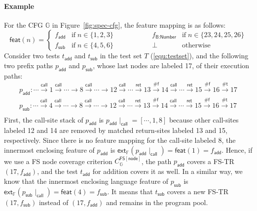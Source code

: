 \documentclass[acmsmall,review,screen]{acmart}
\newcommand{\tif}{\text{if} \; }
\newcommand{\telse}{\text{otherwise}}
\newcommand{\name}[1]{\textsf{#1}}
\newcommand{\graph}{\mathbb{G}}
\newcommand{\node}{n}
\newcommand{\edge}[1]{\xrightarrow{#1}}
\newcommand{\call}{\edge{\name{call}}}
\newcommand{\ret}{\edge{\name{ret}}}
\newcommand{\tedge}{\edge{\name{\#t}}}
\newcommand{\fedge}{\edge{\name{\#f}}}
\newcommand{\pat}{p}
\newcommand{\addpat}{\pat_\name{add}}
\newcommand{\subpat}{\pat_\name{sub}}
\newcommand{\test}{t}
\newcommand{\addtest}{\test_\name{add}}
\newcommand{\subtest}{\test_\name{sub}}
\newcommand{\cov}[1]{C_{#1}}
\newcommand{\featset}{\mathbb{F}}
\newcommand{\feat}{f}
\newcommand{\addfeat}{\feat_{\name{add}}}
\newcommand{\subfeat}{\feat_{\name{sub}}}
\newcommand{\numfeat}{\feat_{\name{B:Number}}}
\newcommand{\featmap}{\name{feat}}
\newcommand{\extfeat}{\name{ext}_\featset}
\newcommand{\css}[1]{{#1}\!\mid_{\name{call}}}
\newcommand{\fnodecov}[1]{\cov{#1}^{\name{FS}[\name{node}]}}
\providecommand{\DIFaddtex}[1]{{\protect\color{blue}\uwave{#1}}} %
\providecommand{\DIFaddbegin}{} %
\providecommand{\DIFaddend}{} %
\providecommand{\DIFadd}[1]{\texorpdfstring{\DIFaddtex{#1}}{#1}} %
\newcommand{\DIFaddincludegraphics}[2][]{{\color{blue}\fbox{\DIFOincludegraphics[#1]{#2}}}} %
\DeclareRobustCommand{\DIFaddbegin}{\DIFOaddbegin \let\includegraphics\DIFaddincludegraphics} %
\DeclareRobustCommand{\DIFaddend}{\DIFOaddend \let\includegraphics\DIFOincludegraphics} %
\begin{document}
\paragraph{\textbf{Example}}
%
For the CFG $\graph$ in Figure~\ref{fig:spec-cfg}, \DIFaddbegin \DIFadd{assume that }\DIFaddend the feature
mapping is as follows:
\begin{equation}\label{equ:featmap}
  \featmap(\node) = \left\{
    \begin{array}{lllll}
      \addfeat & \tif \node \in \{ 1, 2, 3\} &\qquad\qquad&
      \numfeat & \tif \node \in \{ 23, 24, 25, 26 \} \\

      \subfeat & \tif \node \in \{ 4, 5, 6\} &&
      \bot & \telse
    \end{array}
  \right.
\end{equation}
%
Consider two tests $\addtest$ and $\subtest$ in the test set $T$
(\ref{equ:testset}), and the following two prefix paths $\addpat$ and $\subpat$,
whose last nodes are labeled 17, of their execution paths:
%
\[
  \begin{array}{l}
    \addpat: \cdots \call 1 \call \cdots \edge{} 8 \call \cdots \edge{} 12 \call
    \cdots \ret 13 \fedge 14 \call \cdots \ret 15 \fedge 16 \tedge 17\\

    \subpat:\cdots \call 4 \call \cdots \edge{} 8 \call \cdots \edge{} 12 \call
    \cdots \ret 13 \fedge 14 \call \cdots \ret 15 \fedge 16 \tedge 17\\
  \end{array}
\]
%
First, the call-site stack of $\addpat$ is $\css{\addpat} = [\cdots, 1, 8]$
because other call-sites labeled 12 and 14 are removed by matched return-sites
labeled 13 and 15, respectively.
%
Since there is no feature mapping for the call-site labeled 8, the innermost enclosing
feature of $\addpat$ is $\extfeat(\css{\addpat}) = \featmap(1) =
\addfeat$.
%
Hence, if we use a FS node coverage criterion $\fnodecov{\graph}$, the path
$\addpat$ covers a FS-TR $(17, \addfeat)$, and the test $\addtest$ for addition
covers it as well.
%
In a similar way, we know that the innermost enclosing language feature of $\subpat$
is $\extfeat(\css{\subpat}) = \featmap(4) = \subfeat$.
%
It means that $\subtest$ covers a new FS-TR $(17, \subfeat)$ instead of $(17,
\addfeat)$ and remains in the program pool.

\end{document}
